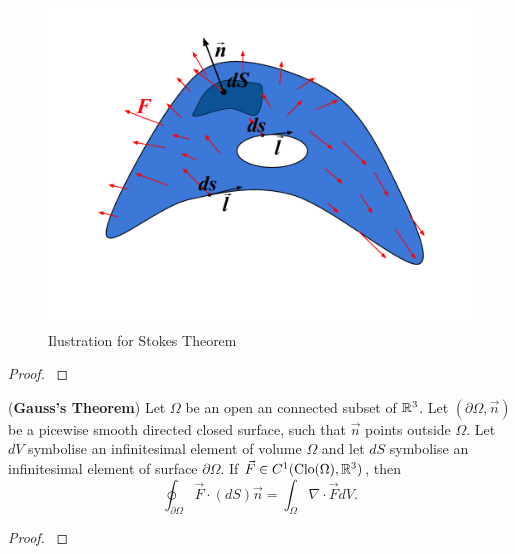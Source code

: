 \documentclass[main.tex]{subfiles}
\begin{document}
\begin{figure}[H]
\centering
\includegraphics[scale=0.5]{figs/Stokes}
\caption{Ilustration for Stokes Theorem}
\end{figure}
\begin{proof}
\cite[see][7.3 Stokes’s and Gauss’s Theorems]{colley2012}
\end{proof}
\begin{theorem}(\textbf{Gauss's Theorem})
Let $\Omega$ be an open an connected subset of $\mathbb{R}^3$. Let $(\partial \Omega, \vec{n})$ be a picewise smooth directed closed surface, such that $\vec{n}$ points outside $\Omega$. Let $dV$ symbolise an infinitesimal element of volume $\Omega$ and let $dS$ symbolise an infinitesimal element of surface $\partial \Omega$. If $\vec{F}\in C^1(\text{Clo}(\Omega), \mathbb{R}^3)$, then
\begin{equation}
\oint_{\partial\Omega} \vec{F} \cdot (dS)\vec{n} = \int_\Omega \nabla \cdot \vec{F} dV.
\end{equation} 
\end{theorem}
\begin{proof}
\cite[see][7.3 Stokes’s and Gauss’s Theorems]{colley2012}
\end{proof}
\end{document}
